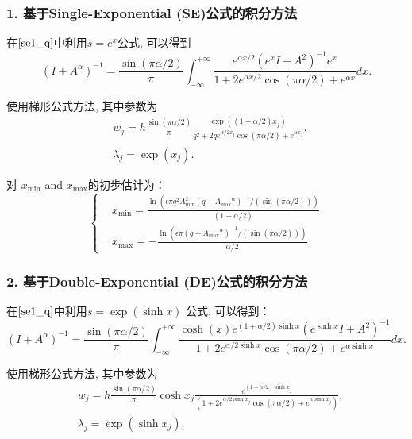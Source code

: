 \subsubsection{1. 基于Single-Exponential (SE)公式的积分方法}
在$\eqref{se1_q}$中利用$s=e^{ x}$公式, 可以得到
\begin{equation}
	(I+{A}^{\alpha})^{-1}=\frac{\sin(\pi \alpha/2)}{\pi}\int_{-\infty}^{+\infty}\frac{e^{\alpha x/2}(e^{ x} I+A^2)^{-1} e^{ x}}{1+2e^{\alpha x/2}\cos(\pi\alpha/2)+e^{\alpha x}} dx.
	\label{expu_se1_q1}
\end{equation}

使用梯形公式方法, 其中参数为
\begin{equation}
	\begin{aligned}
		&w_j=h\frac{\sin(\pi \alpha/2)}{\pi}\frac{ \exp((1+\alpha/2) x_j)}{q^2+2qe^{\alpha/2  x_j}\cos(\pi\alpha/2)+e^{\alpha  x_j}},\\
		&\lambda_j=\exp( x_j).
	\end{aligned}
	\label{lw_SE1_q}
\end{equation}

对 $x_{\min}$ and $x_{\max}$的初步估计为：
\begin{equation}	\label{findminmax_SE1_q}
	\left\{
	\begin{aligned}
		&x_{\min}= \frac{\ln(\epsilon \pi q^2 A^2_{\min} (q+{A_{\max}}^{\alpha})^{-1}/(\sin(\pi \alpha/2)))}{(1+\alpha/2)}\\
		&x_{\max}=-\frac{\ln(\epsilon \pi (q+{A_{\max}}^{\alpha})^{-1}/(\sin(\pi \alpha/2)))}{\alpha /2}
	\end{aligned}
	\right.
\end{equation}

\subsubsection{2. 基于Double-Exponential (DE)公式的积分方法}
在$\eqref{se1_q}$中利用$s=\exp(\sinh x)$ 公式, 可以得到：
\begin{equation}	\label{de1_q1}
	(I+{A}^{\alpha})^{-1}=\frac{\sin(\pi \alpha/2)}{\pi}\int_{-\infty}^{+\infty}
	\frac{\cosh(x)e^{(1+\alpha/2)\sinh x}(e^{\sinh x}{I}+A^2)^{-1}}{1+2 e^{ \alpha/2 \sinh x}\cos(\pi\alpha/2)+e^{\alpha\sinh x}}dx.
\end{equation}

使用梯形公式方法, 其中参数为
\begin{equation}
	\begin{aligned}
		&w_j=h\frac{\sin(\pi \alpha/2)}{\pi}\cosh x_j\frac{e^{(1+\alpha/2)\sinh x_j }}{(1+2 e^{ \alpha/2 \sinh x_j}\cos(\pi\alpha/2)+e^{\alpha\sinh x_j})},\\
		&\lambda_j=\exp(\sinh x_j).
	\end{aligned}
	\label{lw_DE1_q}
\end{equation}

